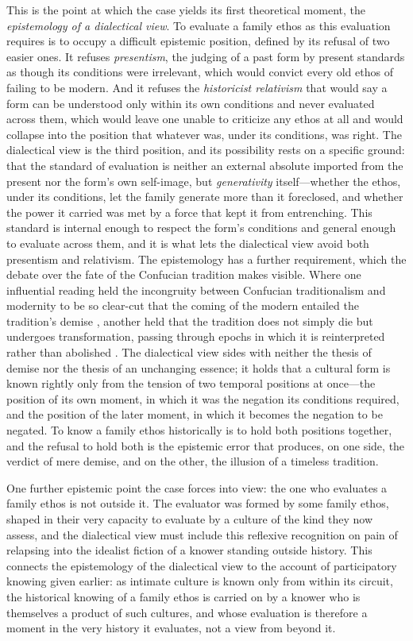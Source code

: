 This is the point at which the case yields its first theoretical moment, the \emph{epistemology of a dialectical view}. To evaluate a family ethos as this evaluation requires is to occupy a difficult epistemic position, defined by its refusal of two easier ones. It refuses \emph{presentism}, the judging of a past form by present standards as though its conditions were irrelevant, which would convict every old ethos of failing to be modern. And it refuses the \emph{historicist relativism} that would say a form can be understood only within its own conditions and never evaluated across them, which would leave one unable to criticize any ethos at all and would collapse into the position that whatever was, under its conditions, was right. The dialectical view is the third position, and its possibility rests on a specific ground: that the standard of evaluation is neither an external absolute imported from the present nor the form's own self-image, but \emph{generativity} itself---whether the ethos, under its conditions, let the family generate more than it foreclosed, and whether the power it carried was met by a force that kept it from entrenching. This standard is internal enough to respect the form's conditions and general enough to evaluate across them, and it is what lets the dialectical view avoid both presentism and relativism. The epistemology has a further requirement, which the debate over the fate of the Confucian tradition makes visible. Where one influential reading held the incongruity between Confucian traditionalism and modernity to be so clear-cut that the coming of the modern entailed the tradition's demise \parencite{levenson1968}, another held that the tradition does not simply die but undergoes transformation, passing through epochs in which it is reinterpreted rather than abolished \parencite{tu1986}. The dialectical view sides with neither the thesis of demise nor the thesis of an unchanging essence; it holds that a cultural form is known rightly only from the tension of two temporal positions at once---the position of its own moment, in which it was the negation its conditions required, and the position of the later moment, in which it becomes the negation to be negated. To know a family ethos historically is to hold both positions together, and the refusal to hold both is the epistemic error that produces, on one side, the verdict of mere demise, and on the other, the illusion of a timeless tradition.

One further epistemic point the case forces into view: the one who evaluates a family ethos is not outside it. The evaluator was formed by some family ethos, shaped in their very capacity to evaluate by a culture of the kind they now assess, and the dialectical view must include this reflexive recognition on pain of relapsing into the idealist fiction of a knower standing outside history. This connects the epistemology of the dialectical view to the account of participatory knowing given earlier: as intimate culture is known only from within its circuit, the historical knowing of a family ethos is carried on by a knower who is themselves a product of such cultures, and whose evaluation is therefore a moment in the very history it evaluates, not a view from beyond it.

